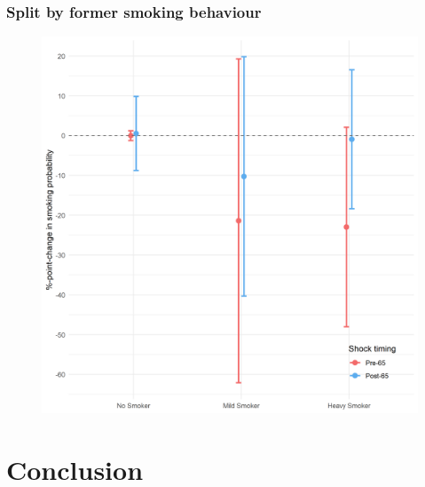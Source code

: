 \documentclass[10pt,compress,xcolor=dvipsnames,aspectratio=169]{beamer}    %
\newcounter{ex}
\newcommand{\1}[1]{\mathrm{1\hspace*{-2.5pt}l}[#1]}	%
\begin{document}
\begin{frame}
\frametitle{Split by former smoking behaviour}

\begin{figure}[hbtp]
	\centering
	\includegraphics[height=0.8\textheight]{../../3_output/shock_effects/fSmokeB_6070_100_cv.png}
	\label{fig:fSmoke}
\end{figure}
\hyperlink{frame:otherX}{}
\end{frame}


\section{Conclusion}
\end{document}
